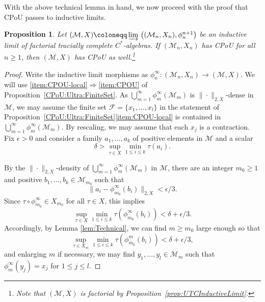 \documentclass[a4paper,11pt]{amsart}
\newtheorem{proposition}[theorem]{Proposition}
\theoremstyle{definition}
\numberwithin{equation}{section}
\numberwithin{theorem}{section}
\newcommand{\M}{\mathcal{M}}
\begin{document}
With the above technical lemma in hand, we now proceed with the proof that CPoU passes to inductive limits.

\begin{proposition}\label{prop:InductiveLimitCPoU}
	Let $(\M, X) \coloneqq \varinjlim\, \big((\M_n,X_n),\phi_n^{n+1}\big)$ be an inductive limit of factorial tracially complete $C^*$-algebras.
	If $(\M_n, X_n)$ has CPoU for all $n \geq 1$, then $(\M, X)$ has CPoU as well.\footnote{Note that $(\M, X)$ is factorial by Proposition~\ref{prop:UTCInductiveLimit}.}
\end{proposition}

\begin{proof}
	Write the inductive limit morphisms as $\phi_n^\infty\colon(\M_n,X_n) \rightarrow (\M, X)$.
    We will use \ref{item:CPOU-local}$\Rightarrow$\ref{item:CPOU} of Proposition~\ref{CPoU:Ultra:FiniteSet}. As $\bigcup_{m=1}^\infty\phi_m^\infty(\M_m)$ is $\|\cdot\|_{2,X}$-dense in $\M$, we may assume the finite set $\mathcal F=\{x_1,\dots,x_l\}$ in the statement of Proposition~\ref{CPoU:Ultra:FiniteSet}\ref{item:CPOU-local} is contained in $\bigcup_{m=1}^\infty\phi_m^\infty(\M_m)$.  By rescaling, we may assume that each $x_j$ is a contraction. Fix $\epsilon>0$ and consider a family $a_1,\dots,a_k$ of positive elements in $\M$ and a scalar
	\begin{equation}
		\delta>\sup_{\tau\in X}\min_{1 \leq i \leq k}\tau(a_i).
	\end{equation}
	
	By the $\|\cdot\|_{2, X}$-density of $\bigcup_{m=1}^\infty\phi_m^\infty(\M_m)$ in $\M$, there are an integer $m_0 \geq 1$ and positive $b_1, \ldots, b_k \in \M_{m_0}$ such that
	\begin{equation}\label{eq:InductiveLimitCPoU1}
		\|a_i - \phi_{m_0}^\infty(b_i)\|_{2,X}<\epsilon/3.
	\end{equation}
	Since $\tau \circ \phi_{m_0}^\infty \in X_{m_0}$ for all $\tau \in X$, this implies
	\begin{equation}
		\sup_{\tau\in X}\min_{1 \leq i \leq k} \tau(\phi_{m_0}^\infty(b_i)) < \delta+\epsilon/3.
	\end{equation}
	Accordingly, by Lemma \ref{lem:Technical}, we can find $m \geq m_0$ large enough so that
	\begin{equation}\label{eqn:Conclusion}
		\sup_{\tau \in X_m} \min_{1 \leq i \leq k} \tau(\phi_{m_0}^m(b_i)) < \delta+\epsilon/3,
	\end{equation}
	and enlarging $m$ if necessary, we may find $y_1, \ldots, y_l \in \M_m$ such that $\phi_m^\infty(y_j) = x_j$ for $1 \leq j \leq l$.
	

\end{proof}
\end{document}
